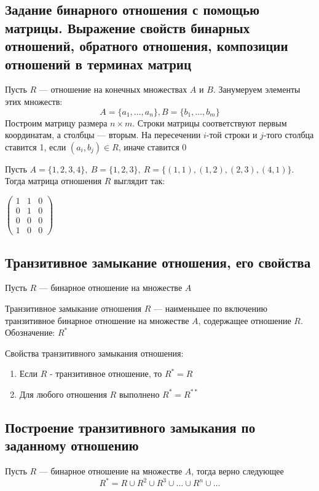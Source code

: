 \documentclass[a4paper]{article}
\begin{document}
\subsection{Задание бинарного отношения с помощью матрицы. Выражение свойств бинарных отношений, обратного отношения, композиции отношений в терминах матриц}
Пусть $R$ — отношение на конечных множествах $A$ и $B$. Занумеруем элементы этих множеств: 
\begin{equation*}
    A=\{a_1,\ldots,a_n\}, B=\{b_1,\ldots,b_m\}
\end{equation*}
Построим матрицу размера $n\times m$. Строки матрицы соответствуют первым координатам, а столбцы — вторым. На пересечении $i$-той строки и $j$-того столбца ставится 1, если $(a_i, b_j)\in R$, иначе ставится 0

\ex Пусть $A=\{1,2,3,4\},\ B=\{1, 2, 3\},\ R=\{(1,1), (1, 2), (2, 3), (4,1)\}$. Тогда матрица отношения $R$ выглядит так:\\[2mm]
\centerline{$\begin{pmatrix}
    1&1&0\\
    0&1&0\\
    0&0&0\\
    1&0&0
\end{pmatrix}$}
\subsection{Транзитивное замыкание отношения, его свойства}
Пусть $R$ — бинарное отношение на множестве $A$

 Транзитивное замыкание отношения $R$ — наименьшее по включению транзитивное бинарное отношение на множестве $A$, содержащее отношение $R$. Обозначение: $R^*$

\label{sec:1.62}Свойства транзитивного замыкания отношения:
\begin{enumerate}
    \item Если $R$ - транзитивное отношение, то $R^*=R$
    \item Для любого отношения $R$ выполнено $R^*=R^{**}$
\end{enumerate}

\subsection{Построение транзитивного замыкания по заданному отношению}
\label{sec:1.63}\theorem Пусть $R$ — бинарное отношение на множестве $A$, тогда верно следующее
\begin{equation*}
    R^*=R\cup R^2\cup R^3\cup\ldots\cup R^n\cup\ldots
\end{equation*}
\end{document}
